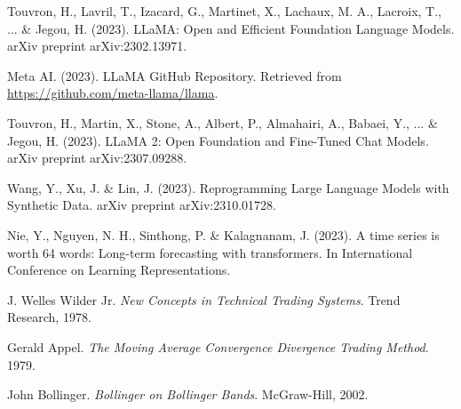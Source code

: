 \begin{thebibliography}{99}
	 Touvron, H., Lavril, T., Izacard, G., Martinet, X., Lachaux, M. A., Lacroix, T., ... \& Jegou, H. (2023). LLaMA: Open and Efficient Foundation Language Models. arXiv preprint arXiv:2302.13971.

	 Meta AI. (2023). LLaMA GitHub Repository. Retrieved from \url{https://github.com/meta-llama/llama}.

	 Touvron, H., Martin, X., Stone, A., Albert, P., Almahairi, A., Babaei, Y., ... \& Jegou, H. (2023). LLaMA 2: Open Foundation and Fine-Tuned Chat Models. arXiv preprint arXiv:2307.09288.

	 Wang, Y., Xu, J. \& Lin, J. (2023). Reprogramming Large Language Models with Synthetic Data. arXiv preprint arXiv:2310.01728.

	 Nie, Y., Nguyen, N. H., Sinthong, P. \& Kalagnanam, J. (2023). A time series is worth 64 words: Long-term forecasting with transformers. In International Conference on Learning Representations.

	J. Welles Wilder Jr.
	\textit{New Concepts in Technical Trading Systems}.
	Trend Research, 1978.

	Gerald Appel.
	\textit{The Moving Average Convergence Divergence Trading Method}.
	1979.

	John Bollinger.
	\textit{Bollinger on Bollinger Bands}.
	McGraw-Hill, 2002.
\end{thebibliography}
